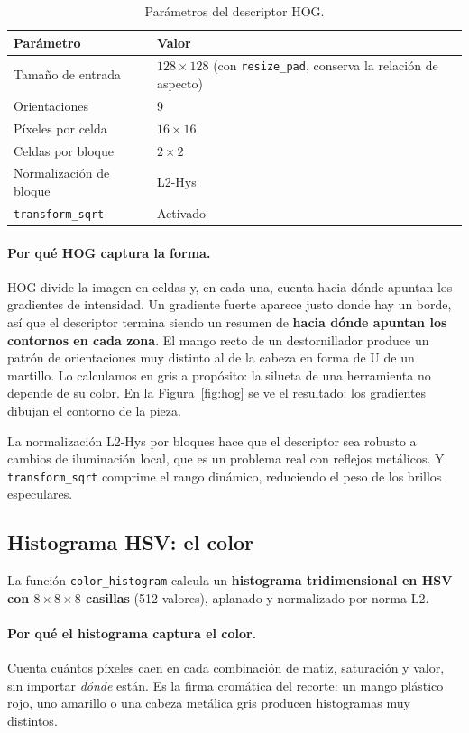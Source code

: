 \documentclass[11pt,a4paper]{article}
\begin{document}
\begin{table}[htbp]
\centering
\caption{Parámetros del descriptor HOG.}
\label{tab:hog}
\small
\begin{tabular}{@{}ll@{}}
\toprule
\textbf{Parámetro} & \textbf{Valor} \\
\midrule
Tamaño de entrada & $128\times128$ (con \texttt{resize\_pad}, conserva la relación de aspecto) \\
Orientaciones & 9 \\
Píxeles por celda & $16\times16$ \\
Celdas por bloque & $2\times2$ \\
Normalización de bloque & L2-Hys \\
\texttt{transform\_sqrt} & Activado \\
\bottomrule
\end{tabular}
\end{table}

\paragraph{Por qué HOG captura la forma.}
HOG divide la imagen en celdas y, en cada una, cuenta hacia dónde apuntan los gradientes de
intensidad. Un gradiente fuerte aparece justo donde hay un borde, así que el descriptor termina
siendo un resumen de \textbf{hacia dónde apuntan los contornos en cada zona}. El mango recto de un
destornillador produce un patrón de orientaciones muy distinto al de la cabeza en forma de U de un
martillo. Lo calculamos en gris a propósito: la silueta de una herramienta no depende de su color.
En la Figura~\ref{fig:hog} se ve el resultado: los gradientes dibujan el contorno de la pieza.

La normalización L2-Hys por bloques hace que el descriptor sea robusto a cambios de iluminación
local, que es un problema real con reflejos metálicos. Y \texttt{transform\_sqrt} comprime el rango
dinámico, reduciendo el peso de los brillos especulares.

\subsection{Histograma HSV: el color}

La función \texttt{color\_histogram} calcula un \textbf{histograma tridimensional en HSV con
$8\times8\times8$ casillas} (512 valores), aplanado y normalizado por norma L2.

\paragraph{Por qué el histograma captura el color.}
Cuenta cuántos píxeles caen en cada combinación de matiz, saturación y valor, sin importar
\emph{dónde} están. Es la firma cromática del recorte: un mango plástico rojo, uno amarillo o una
cabeza metálica gris producen histogramas muy distintos.
\end{document}
